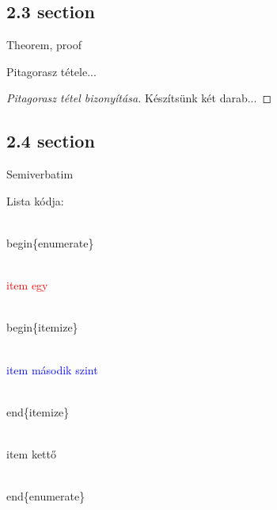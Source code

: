 \documentclass[aspectratio=169, bigger, xcolor=table]{beamer}
\begin{document}
        \subsection{2.3 section}
        \begin{frame}{Theorem, proof}
            \begin{theorem}
                Pitagorasz tétele...
            \end{theorem}
            
            \begin{proof}[Pitagorasz tétel bizonyítása]
                Készítsünk két darab... \qedhere
            \end{proof}
        \end{frame}
        
        \subsection{2.4 section}
        \begin{frame}{Semiverbatim}
            \begin{semiverbatim}
                Lista kódja:
                
                    \\begin\{enumerate\}
                    
                        \textcolor{red}{\\item egy}
                        
                        \\begin\{itemize\}
                        
                            \textcolor{blue}{\\item második szint}
                            
                        \\end\{itemize\}
                        
                        \\item kettő
                        
                    \\end\{enumerate\}
            \end{semiverbatim}
        \end{frame}
    
\end{document}
